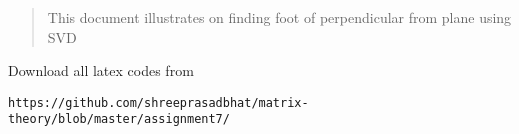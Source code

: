\documentclass[journal,12pt,twocolumn]{IEEEtran}
\begin{document}
% 
\maketitle
\newpage
\bigskip
\renewcommand{\thefigure}{\theenumi}
\renewcommand{\thetable}{\theenumi}
%
%
\begin{abstract}
This document illustrates on finding foot of perpendicular from plane using SVD
\end{abstract}
Download all latex codes from 
\begin{lstlisting}
https://github.com/shreeprasadbhat/matrix-theory/blob/master/assignment7/
\end{lstlisting}
%
\end{document}
